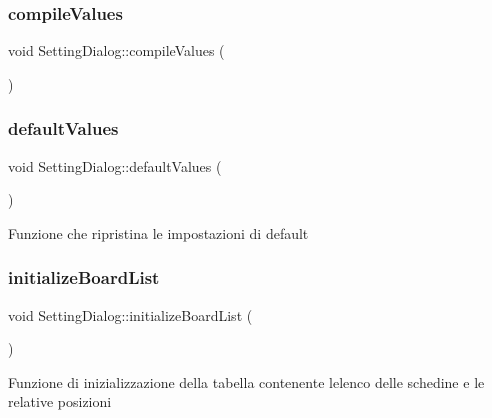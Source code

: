 \subsubsection{\texorpdfstring{compile\+Values}{compileValues}}
{\footnotesize\ttfamily void Setting\+Dialog\+::compile\+Values (\begin{DoxyParamCaption}{ }\end{DoxyParamCaption})\hspace{0.3cm}{\ttfamily [slot]}}

\mbox{\label{class_setting_dialog_a6801ca5900f6e9e18e73d7c7ca56031e}} 
\subsubsection{\texorpdfstring{default\+Values}{defaultValues}}
{\footnotesize\ttfamily void Setting\+Dialog\+::default\+Values (\begin{DoxyParamCaption}{ }\end{DoxyParamCaption})\hspace{0.3cm}{\ttfamily [slot]}}

Funzione che ripristina le impostazioni di default \mbox{\label{class_setting_dialog_a6fe937ee3aa7b80823783c1842b883fd}} 
\subsubsection{\texorpdfstring{initialize\+Board\+List}{initializeBoardList}}
{\footnotesize\ttfamily void Setting\+Dialog\+::initialize\+Board\+List (\begin{DoxyParamCaption}{ }\end{DoxyParamCaption})\hspace{0.3cm}{\ttfamily [slot]}}

Funzione di inizializzazione della tabella contenente l\textquotesingle{}elenco delle schedine e le relative posizioni \mbox{\label{class_setting_dialog_ac1b49924409e267093cfc6e9507ef676}} 
